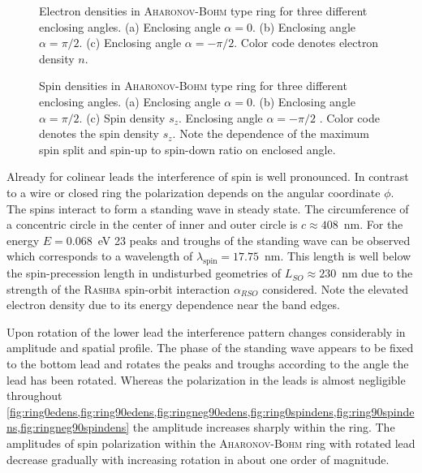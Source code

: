 \begin{figure}[h!]
\caption{Electron densities in \textsc{Aharonov-Bohm} type ring for three different enclosing angles. (a) Enclosing angle $\alpha=0$. (b) Enclosing angle $\alpha=\pi/2$. (c) Enclosing angle $\alpha=-\pi/2$. Color code denotes electron density $n$.} 
\end{figure}
\begin{figure}[h!]
\caption{Spin densities in \textsc{Aharonov-Bohm} type ring for three different enclosing angles. (a) Enclosing angle $\alpha=0$. (b) Enclosing angle $\alpha=\pi/2$. (c) Spin density $s_z$. Enclosing angle $\alpha=-\pi/2$ . Color code denotes the spin density $s_z$. Note the dependence of the maximum spin split and spin-up to spin-down ratio on enclosed angle.}
\end{figure}
Already for colinear leads the interference of spin is well pronounced. In contrast to a wire or closed ring \cite{PhysRevB.82.165322} the polarization depends on the angular coordinate $\phi$.
The spins interact to form a standing wave in steady state. The circumference of a concentric circle in the center of inner and outer circle is $c\approx 408$~nm. For the energy $E=0.068$~eV 23 peaks and troughs of the standing wave can be observed which corresponds to a wavelength of $\lambda_{\text{spin}}=17.75$~nm. This length is well below the spin-precession length in undisturbed geometries of $L_{SO}\approx230$~nm due to the strength of the \textsc{Rashba} spin-orbit interaction $\alpha_{RSO}$ considered. Note the elevated electron density due to its energy dependence near the band edges.\par
Upon rotation of the lower lead the interference pattern changes considerably in amplitude and spatial profile. The phase of the standing wave appears to be fixed to the bottom lead and rotates the peaks and troughs according to the angle the lead has been rotated. Whereas the polarization in the leads is almost negligible throughout \cref{fig:ring0edens,fig:ring90edens,fig:ringneg90edens,fig:ring0spindens,fig:ring90spindens,fig:ringneg90spindens} the amplitude increases sharply within the ring. The amplitudes of spin polarization within the \textsc{Aharonov-Bohm} ring with rotated lead decrease gradually with increasing rotation in about one order of magnitude.\par
